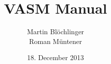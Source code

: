 \title{VASM Manual}
\date{18. December 2013}
\author{Martin Blöchlinger \\ Roman Müntener}
\maketitle
\thispagestyle{empty}
\newpage
